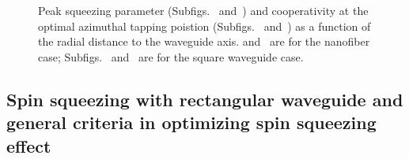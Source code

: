 \documentclass[preprint,aps,pra,onecolumn,superscriptaddress]{revtex4-1} %
\begin{document}
\newpage
\begin{figure}[htb]
\centering
 \begin{minipage}[h]{0.95\linewidth}
    \hfill
   \end{minipage}\vfill
   \begin{minipage}[h]{0.95\linewidth}
       \hfill
   \end{minipage}
\caption{Peak squeezing parameter (Subfigs.~\protect{} and~\protect{}) and cooperativity at the optimal azimuthal tapping poistion (Subfigs.~\protect{} and~\protect{}) as a function of the radial distance to the waveguide axis. \protect{} and~\protect{} are for the nanofiber case; Subfigs.~\protect{} and~\protect{} are for the square waveguide case. }\label{fig:peakxi_rp_NA}
\end{figure}


\subsection{Spin squeezing with rectangular waveguide and general criteria in optimizing spin squeezing effect} \label{Sec::Waveguide}
\end{document}
